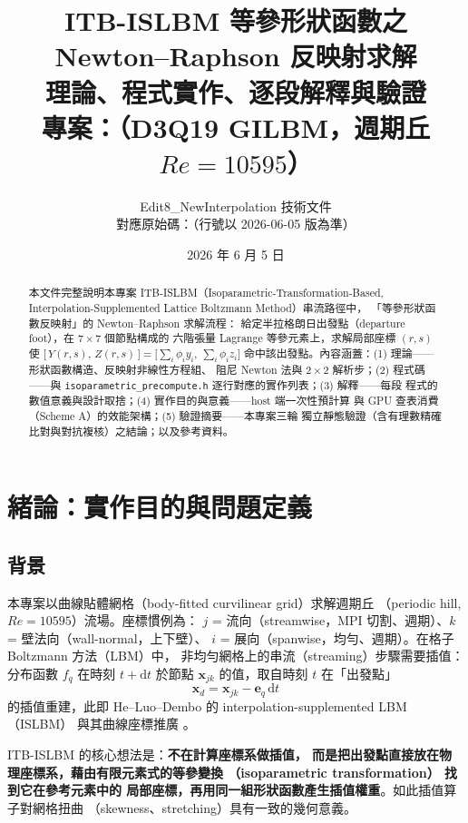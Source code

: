 \documentclass[11pt,a4paper]{article}
\title{\textbf{ITB-ISLBM 等參形狀函數之 Newton--Raphson 反映射求解}\\[4pt]
\large 理論、程式實作、逐段解釋與驗證\\[2pt]
\normalsize 專案：\code{5.Re10595/Edit8\_NewInterpolation}（D3Q19 GILBM，週期丘 $Re=10595$）}
\author{Edit8\_NewInterpolation 技術文件\\
\small 對應原始碼：\code{itblbm/isoparametric\_precompute.h}（行號以 2026-06-05 版為準）}
\date{2026 年 6 月 5 日}
\newcommand{\code}[1]{\texttt{#1}}
\begin{document}
\maketitle

\begin{abstract}
本文件完整說明本專案 ITB-ISLBM（Isoparametric-Transformation-Based,
Interpolation-Supplemented Lattice Boltzmann Method）串流路徑中，
「等參形狀函數反映射」的 Newton--Raphson 求解流程：
給定半拉格朗日出發點（departure foot），在 $7\times 7$ 個節點構成的
六階張量 Lagrange 等參元素上，求解局部座標 $(r,s)$ 使
$\bigl[\,Y(r,s),\,Z(r,s)\,\bigr]=\bigl[\sum_i \phi_i y_i,\ \sum_i \phi_i z_i\bigr]$
命中該出發點。內容涵蓋：(1) 理論——形狀函數構造、反映射非線性方程組、
阻尼 Newton 法與 $2\times 2$ 解析步；(2) 程式碼——與
\code{isoparametric\_precompute.h} 逐行對應的實作列表；(3) 解釋——每段
程式的數值意義與設計取捨；(4) 實作目的與意義——host 端一次性預計算
與 GPU 查表消費（Scheme A）的效能架構；(5) 驗證摘要——本專案三輪
獨立靜態驗證（含有理數精確比對與對抗複核）之結論；以及參考資料。
\end{abstract}

\tableofcontents
\newpage

\section{緒論：實作目的與問題定義}
\label{sec:intro}

\subsection{背景}
本專案以曲線貼體網格（body-fitted curvilinear grid）求解週期丘
（periodic hill, $Re=10595$）流場。座標慣例為：
$j$ = 流向（streamwise，MPI 切割、週期）、$k$ = 壁法向（wall-normal，上下壁）、
$i$ = 展向（spanwise，均勻、週期）。在格子 Boltzmann 方法（LBM）中，
非均勻網格上的串流（streaming）步驟需要插值：分布函數 $f_q$ 在時刻
$t+\mathrm{d}t$ 於節點 $\bm{x}_{jk}$ 的值，取自時刻 $t$ 在「出發點」
\begin{equation}
\bm{x}_d=\bm{x}_{jk}-\bm{e}_q\,\mathrm{d}t
\label{eq:foot}
\end{equation}
的插值重建，此即 He--Luo--Dembo 的 interpolation-supplemented LBM
（ISLBM）\cite{HeLuoDembo1996} 與其曲線座標推廣 \cite{HeDoolen1997,Imamura2005}。

ITB-ISLBM \cite{ITBpaper} 的核心想法是：\textbf{不在計算座標系做插值，
而是把出發點直接放在物理座標系，藉由有限元素式的等參變換
（isoparametric transformation）\cite{Hughes2000} 找到它在參考元素中的
局部座標，再用同一組形狀函數產生插值權重}。如此插值算子對網格扭曲
（skewness、stretching）具有一致的幾何意義。
\end{document}
